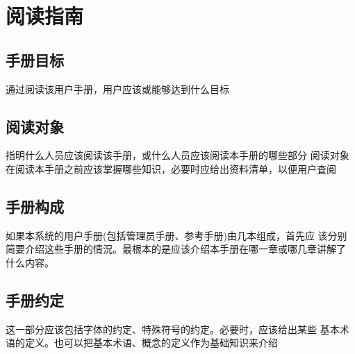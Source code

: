 \chapter{阅读指南}
\section{手册目标}
通过阅读该用户手册，用户应该或能够达到什么目标
\section{阅读对象}
指明什么人员应该阅读该手册，或什么人员应该阅读本手册的哪些部分
阅读对象在阅读本手册之前应该掌握哪些知识，必要时应给出资料清单，以便用户査阅
\section{手册构成}
如果本系统的用户手册(包括管理员手册、参考手册)由几本组成，首先应
该分别简要介绍这些手册的情況。最根本的是应该介绍本手册在哪一章或哪几章讲解了
什么内容。
\section{手册约定}
这一部分应该包括字体的约定、特殊符号的约定。必要时，应该给出某些
基本术语的定义。也可以把基本术语、概念的定义作为基础知识来介绍